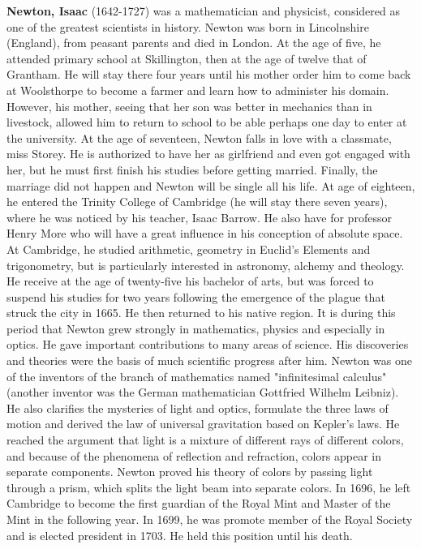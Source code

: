 \textbf{Newton, Isaac} (1642-1727) was a mathematician and physicist, considered as one of the greatest scientists in history. Newton was born in Lincolnshire (England), from peasant parents and died in London. At the age of five, he attended primary school at Skillington, then at the age of twelve that of Grantham. He will stay there four years until his mother order him to come back at Woolsthorpe to become a farmer and learn how to administer his domain. However, his mother, seeing that her son was better in mechanics than in livestock, allowed him to return to school to be able perhaps one day to enter at the university. At the age of seventeen, Newton falls in love with a classmate, miss Storey. He is authorized to have her as girlfriend and even got engaged with her, but he must first finish his studies before getting married. Finally, the marriage did not happen and Newton will be single all his life. At age of eighteen, he entered the Trinity College of Cambridge (he will stay there seven years), where he was noticed by his teacher, Isaac Barrow. He also have for professor Henry More who will have a great influence in his conception of absolute space. At Cambridge, he studied arithmetic, geometry in Euclid's Elements and trigonometry, but is particularly interested in astronomy, alchemy and theology. He receive at the age of twenty-five his bachelor of arts, but was forced to suspend his studies for two years following the emergence of the plague that struck the city in 1665. He then returned to his native region. It is during this period that Newton grew strongly in mathematics, physics and especially in optics. He gave important contributions to many areas of science. His discoveries and theories were the basis of much scientific progress after him. Newton was one of the inventors of the branch of mathematics named "infinitesimal calculus" (another inventor was the German mathematician Gottfried Wilhelm Leibniz). He also clarifies the mysteries of light and optics, formulate the three laws of motion and derived the law of universal gravitation based on Kepler's laws. He reached the argument that light is a mixture of different rays of different colors, and because of the phenomena of reflection and refraction, colors appear in separate components. Newton proved his theory of colors by passing light through a prism, which splits the light beam into separate colors. In 1696, he left Cambridge to become the first guardian of the Royal Mint and Master of the Mint in the following year. In 1699, he was promote member of the Royal Society and is elected president in 1703. He held this position until his death.

